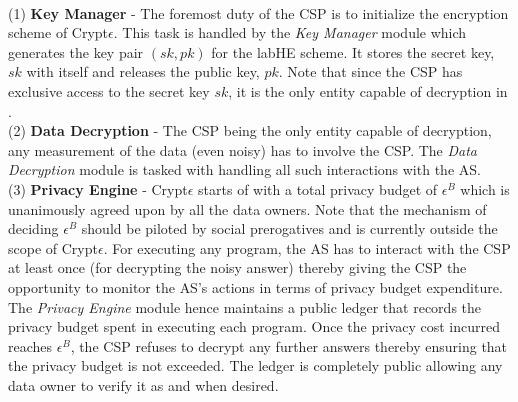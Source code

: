 \\
(1)\textbf{ Key Manager }- The foremost duty of the \textsf{CSP} is to initialize the encryption scheme of Crypt$\epsilon$. This task is handled by the \textit{Key Manager} module which generates the key pair $(sk,pk)$ for the \textsf{labHE} scheme. It stores the secret key, $sk$ with itself and releases the public key, $pk$. Note that since the \textsf{CSP} has exclusive access to the secret key $sk$, it is the only entity capable of decryption in \system.\\
(2)\textbf{ Data Decryption }- The \textsf{CSP} being the only entity capable of decryption,  any measurement of the data (even noisy) has to involve the \textsf{CSP}. The \textit{Data Decryption} module is tasked with handling all such interactions with the \textsf{AS}. \\
(3)\textbf{ Privacy Engine }- Crypt$\epsilon$ starts of with a total privacy budget of $\epsilon^B$ which is unanimously agreed upon by all the data owners. Note that the mechanism of deciding $\epsilon^B$ should be piloted by social prerogatives \cite{e1,e2} 
and is currently outside the scope of Crypt$\epsilon$. For executing any program, the \textsf{AS} has to interact with the \textsf{CSP} at least once (for decrypting the noisy answer) thereby giving the \textsf{CSP} the opportunity to monitor the \textsf{AS}'s actions in terms of privacy budget expenditure. The \textit{Privacy Engine} module hence maintains a public ledger that records the privacy budget spent in executing each program. Once the privacy cost incurred reaches 
$\epsilon^B$, the \textsf{CSP} refuses to decrypt any further answers thereby ensuring that the privacy budget is not exceeded.  The ledger is completely public allowing any data owner to verify it as and when desired.

